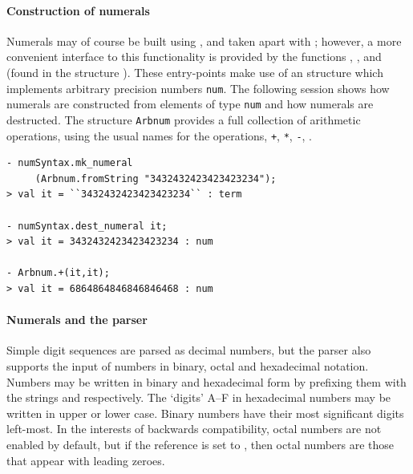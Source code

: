 \paragraph {Construction of numerals}

Numerals may of course be built using , and taken apart with
; however, a more convenient interface to this
functionality is provided by the functions ,
, and  (found in the structure
). These entry-points make use of an \ML{} structure
 which implements arbitrary precision numbers {\verb+num+}. The
following session shows how \HOL{} numerals are constructed from elements of
type \verb+num+ and how numerals are destructed. The structure
{\small\verb+Arbnum+} provides a full collection of arithmetic
operations, using the usual names for the operations, \eg \verb|+|,
\verb|*|, \verb|-|, \etc.

\begin{session}
\begin{verbatim}
- numSyntax.mk_numeral
     (Arbnum.fromString "3432432423423423234");
> val it = ``3432432423423423234`` : term

- numSyntax.dest_numeral it;
> val it = 3432432423423423234 : num

- Arbnum.+(it,it);
> val it = 6864864846846846468 : num
\end{verbatim}
\end{session}

\paragraph{Numerals and the parser}
%
%
Simple digit sequences are parsed as decimal numbers, but the parser
also supports the input of numbers in binary, octal and hexadecimal
notation.  Numbers may be written in binary and hexadecimal form by
prefixing them with the strings  and  respectively.  The
`digits' A--F in hexadecimal numbers may be written in upper or lower
case.  Binary numbers have their most significant digits left-most. In
the interests of backwards compatibility, octal numbers are not
enabled by default, but if the reference
 is set to , then octal
numbers are those that appear with leading zeroes.


